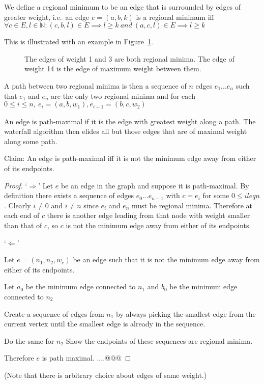 \documentclass{jfp}
\begin{document}
We define a regional minimum to be an edge that is surrounded by edges
of greater weight, i.e.\ an edge $e = (a,b,k)$ is a regional
minimum iff $\forall c \in E, l \in \mathbb{N} : (c,b,l) \in E
\implies l \geq k\ and\ (a,c,l) \in E \implies l \geq k $


This is illustrated with an example in Figure~\ref{fig:regmin}.

\begin{figure}
\centering
\ifpdf
\else
\fi
\caption{The edges of weight 1 and 3 are both regional minima. The
  edge of weight 14 is the edge of maximum weight between them.}
\label{fig:regmin}
\end{figure}

A path between two regional minima is then a sequence of $n$ edges $e_1 ... e_n$
such that $e_1$ and $e_n$ are the only two regional minima
and for each $ 0 \leq i \le n,\ e_i = (a,b,w_1) , e_{i+1} = (b,c,w_2)$

\noindent An edge is path-maximal if it is the edge with greatest
weight along a path.
The waterfall algorithm then elides all but those edges that are of
maximal weight along some path.

\noindent Claim: An edge is path-maximal iff it is not the minimum
edge away from either of its endpoints.



\begin{proof}

\noindent `$\Rightarrow$'
\indent
  Let $e$ be an edge in the graph and suppose it is path-maximal.
  By definition there exists a sequence of edges $e_0 ... e_{n-1}$
  with $c = e_i$ for some $ 0 \leq i leq n$. Clearly $i \neq 0$ and $i \neq n$ since
  $e_i$ and $e_n$ must be regional minima. Therefore at each end of $c$ there is another edge
  leading from that node with weight smaller than that of $c$, so $c$ is
  not the minimum edge away from either of its endpoints.

\vspace{13pt}

\noindent
`$\Leftarrow$'
\indent

  Let $e = (n_1,n_2,w_e)$ be an edge such that it is not the minimum
  edge away from either of its endpoints.

  Let $a_0$ be the minimum edge connected to $n_1$ and $b_0$ be the
  minimum edge connected to $n_2$

  Create a sequence of edges from $n_1$ by always picking the smallest
  edge from the current vertex until the smallest edge is already in
  the sequence.

  Do the same for $n_2$ Show the endpoints of these sequences are
  regional minima.

  Therefore $e$ is path maximal.  ....@@@


\end{proof}
(Note that there is arbitrary choice about edges of same weight.)
\end{document}
